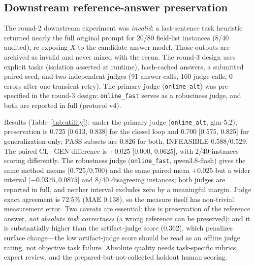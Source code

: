 \documentclass[journal]{IEEEtran}
\begin{document}
\subsection{Downstream reference-answer preservation}\label{sec:res-down}
The round-2 downstream experiment was \emph{invalid}: a last-sentence task heuristic returned nearly the full original prompt for 20/80 field-list instances (8/40 audited), re-exposing $X$ to the candidate answer model. Those outputs are archived as invalid and never mixed with the rerun. The round-3 design uses explicit tasks (isolation asserted at runtime), hash-cached answers, a submitted paired seed, and two independent judges (91 answer calls, 160 judge calls, 0 errors after one transient retry). The primary judge (\texttt{online\_alt}) was pre-specified in the round-3 design; \texttt{online\_fast} serves as a robustness judge, and both are reported in full (protocol v4).

Results (Table~\ref{tab:utility}): under the primary judge (\texttt{online\_alt}, glm-5.2), preservation is 0.725 [0.613, 0.838] for the closed loop and 0.700 [0.575, 0.825] for generalization-only; PASS subsets are 0.826 for both, INFEASIBLE 0.588/0.529. The paired CL$-$GEN difference is $+0.025$ [0.000, 0.0625], with 2/40 instances scoring differently. The robustness judge (\texttt{online\_fast}, qwen3.8-flash) gives the same method means (0.725/0.700) and the same paired mean $+0.025$ but a wider interval [$-0.0375, 0.0875$] and 8/40 disagreeing instances; both judges are reported in full, and neither interval excludes zero by a meaningful margin. Judge exact agreement is 72.5\% (MAE 0.138), so the measure itself has non-trivial measurement error. Two caveats are essential: this is preservation of the reference answer, \emph{not absolute task correctness} (a wrong reference can be preserved); and it is substantially higher than the artifact-judge score (0.362), which penalizes surface change---the low artifact-judge score should be read as an offline judge rating, not objective task failure. Absolute quality needs task-specific rubrics, expert review, and the prepared-but-not-collected holdout human scoring.
\end{document}
